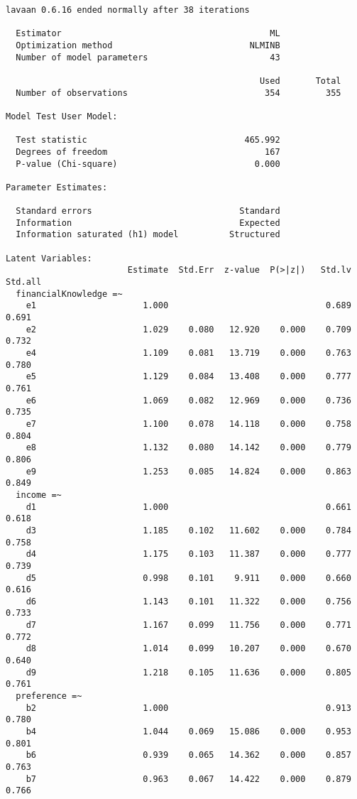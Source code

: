 \documentclass[
  super,
  preprint,
  3p]{elsarticle}
\begin{document}
\begin{verbatim}
lavaan 0.6.16 ended normally after 38 iterations

  Estimator                                         ML
  Optimization method                           NLMINB
  Number of model parameters                        43

                                                  Used       Total
  Number of observations                           354         355

Model Test User Model:
                                                      
  Test statistic                               465.992
  Degrees of freedom                               167
  P-value (Chi-square)                           0.000

Parameter Estimates:

  Standard errors                             Standard
  Information                                 Expected
  Information saturated (h1) model          Structured

Latent Variables:
                        Estimate  Std.Err  z-value  P(>|z|)   Std.lv  Std.all
  financialKnowledge =~                                                      
    e1                     1.000                               0.689    0.691
    e2                     1.029    0.080   12.920    0.000    0.709    0.732
    e4                     1.109    0.081   13.719    0.000    0.763    0.780
    e5                     1.129    0.084   13.408    0.000    0.777    0.761
    e6                     1.069    0.082   12.969    0.000    0.736    0.735
    e7                     1.100    0.078   14.118    0.000    0.758    0.804
    e8                     1.132    0.080   14.142    0.000    0.779    0.806
    e9                     1.253    0.085   14.824    0.000    0.863    0.849
  income =~                                                                  
    d1                     1.000                               0.661    0.618
    d3                     1.185    0.102   11.602    0.000    0.784    0.758
    d4                     1.175    0.103   11.387    0.000    0.777    0.739
    d5                     0.998    0.101    9.911    0.000    0.660    0.616
    d6                     1.143    0.101   11.322    0.000    0.756    0.733
    d7                     1.167    0.099   11.756    0.000    0.771    0.772
    d8                     1.014    0.099   10.207    0.000    0.670    0.640
    d9                     1.218    0.105   11.636    0.000    0.805    0.761
  preference =~                                                              
    b2                     1.000                               0.913    0.780
    b4                     1.044    0.069   15.086    0.000    0.953    0.801
    b6                     0.939    0.065   14.362    0.000    0.857    0.763
    b7                     0.963    0.067   14.422    0.000    0.879    0.766


\end{verbatim}
\end{document}
